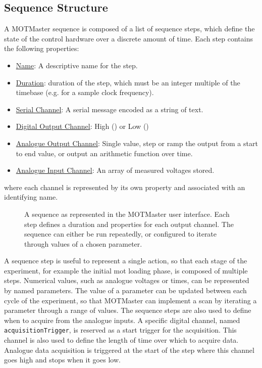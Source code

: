 \subsection{Sequence Structure}
A MOTMaster sequence is composed of a list of sequence steps, which define
the state of the control hardware over a discrete amount of time.
Each step
contains the following properties:
\begin{itemize}
    \item \underline{Name}: A descriptive name for the step.
    \item \underline{Duration}: duration of the step, which must be an integer multiple of the timebase (e.g.  for a 
    sample clock frequency).
    \item \underline{Serial Channel}: A serial message encoded as a string of text.
    \item \underline{Digital Output Channel}: High () or Low ()
    \item \underline{Analogue Output Channel}: Single value, step or ramp the output from a start to end value, or output an arithmetic function over time.
    \item \underline{Analogue Input Channel}: An array of measured
      voltages stored.
\end{itemize}
where each channel is represented by its own property and associated
with an identifying name.
\begin{figure}[!htbp]
    \centering
    \caption[MOTMaster user interface]{A sequence as represented in the MOTMaster user interface. Each step defines a duration and properties for each output channel. The sequence can either be run repeatedly, or configured to iterate through values of a chosen parameter.}
    \label{fig:motmaster_sequence}
\end{figure}
\par\noindent
A sequence step is useful to represent a single action, so that each
stage of the experiment, for example the initial \ac{mot} loading phase, is
composed of multiple steps. Numerical values, such as analogue voltages or
times, can be represented by named parameters. The value of a parameter can
be updated between each cycle of the experiment, so that MOTMaster can
implement a scan by iterating a parameter through a range of values. The sequence steps are also used to
define when to acquire from the analogue inputs. A specific digital channel,
named \verb|acquisitionTrigger|, is reserved as a start trigger for the
acquisition. This channel is also used to define the length of time over which to acquire data. Analogue data acquisition is triggered at the start of the step where this channel goes high and stops when it goes low. 
